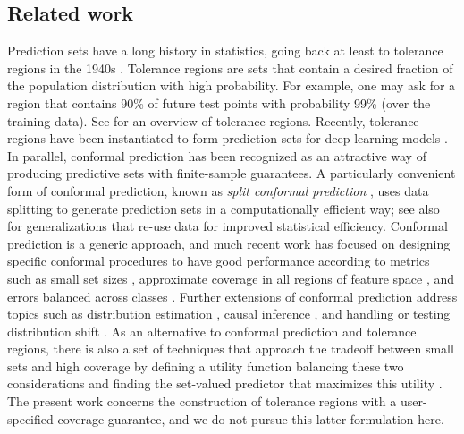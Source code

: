 \documentclass[10pt]{article}
\begin{document}
\subsection*{Related work}
Prediction sets have a long history in statistics, going back at least to tolerance regions in the 1940s \cite{wilks1941, wilks1942, wald1943, tukey1947}. Tolerance regions are sets that contain a desired fraction of the population distribution with high probability. For example, one may ask for a region that contains 90\% of future test points with probability 99\% (over the training data). See \cite{krishnamoorthy2009statistical} for an overview of tolerance regions. Recently, tolerance regions have been instantiated to form prediction sets for deep learning models \cite{Park2020PAC, park2021pac}.
In parallel, conformal prediction \cite{vovk1999machine, vovk2005algorithmic} has been recognized as an attractive way of producing predictive sets with finite-sample guarantees. A particularly convenient form of conformal prediction, known as \emph{split conformal prediction} \cite{papadopoulos2002inductive, lei2013conformal}, uses data splitting to generate prediction sets in a computationally efficient way; see also \cite{vovk2015cross, barber2019jackknife} for generalizations that re-use data for improved  statistical efficiency. Conformal prediction is a generic approach, and much recent work has focused on designing specific conformal procedures to have good performance according to metrics such as small set sizes \cite{Sadinle2016LeastAS}, approximate coverage in all regions of feature space \cite{barber2019limits, romano2019conformalized, izbicki2019flexible, romano2020classification, cauchois2020knowing, guan2020conformal, angelopoulos2020sets}, and errors balanced across classes \cite{lei2014classification, Sadinle2016LeastAS, hechtlinger2018cautious, guan2019prediction}. Further extensions of conformal prediction address topics such as distribution estimation \cite{vovk2019conformal}, causal inference \cite{lei2020conformal}, and handling or testing distribution shift \cite{tibshirani2019conformal, cauchois2020robust, hu2020distributionfree}.
As an alternative to conformal prediction and tolerance regions, there is also a set of techniques that approach the tradeoff between small sets and high coverage by defining a utility function balancing these two considerations and finding the set-valued predictor that maximizes this utility \cite[e.g.,][]{grycko1993classification, delcoz2009learning, mortier2020efficient}. The present work concerns the construction of tolerance regions with a user-specified coverage guarantee, and we do not pursue this latter formulation here.
\end{document}
